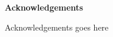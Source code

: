 \clearemptydoublepage
{}
\vspace*{2cm}
{\Large \bf Acknowledgements}

\vspace{1cm}

Acknowledgements goes here
